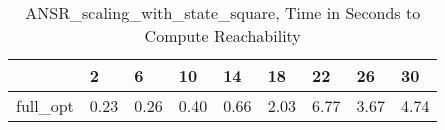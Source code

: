 \begin{table}
\caption{ANSR\_scaling\_with\_state\_square, Time in Seconds to Compute Reachability}
\label{ANSR_scaling_with_state_square_states_time}
\begin{tabular}{lllllllll}
\toprule
 & 2 & 6 & 10 & 14 & 18 & 22 & 26 & 30 \\
\midrule
full\_opt & 0.23 & 0.26 & 0.40 & 0.66 & 2.03 & 6.77 & 3.67 & 4.74 \\
\bottomrule
\end{tabular}
\end{table}
